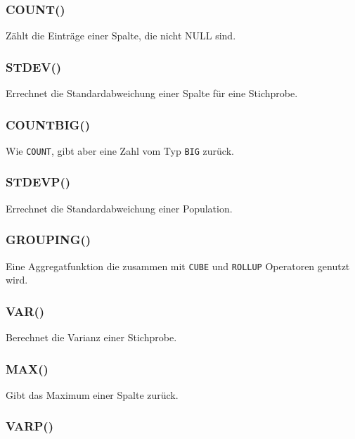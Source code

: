 \documentclass[12pt,ngerman,a4paper,index=totoc,twoside]{scrartcl}
\newcommand{\sql}[1]{\texttt{#1}}
\begin{document}
\subsubsection{COUNT()} 

Zählt die Einträge einer Spalte, die nicht NULL sind.

\subsubsection{STDEV()} 

Errechnet die Standardabweichung einer Spalte für eine Stichprobe.

\subsubsection{COUNT\textunderscore BIG()} 

Wie \sql{COUNT}, gibt aber eine Zahl vom Typ \sql{BIG} zurück.

\subsubsection{STDEVP()} 

Errechnet die Standardabweichung einer Population.

\subsubsection{GROUPING()} 

Eine Aggregatfunktion die zusammen mit \sql{CUBE} und \sql{ROLLUP} Operatoren genutzt wird.

\subsubsection{VAR()} 

Berechnet die Varianz einer Stichprobe.

\subsubsection{MAX()} 

Gibt das Maximum einer Spalte zurück.

\subsubsection{VARP()} 
\end{document}
